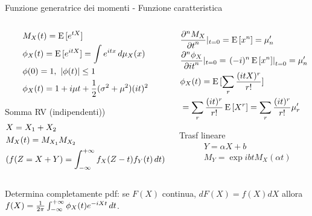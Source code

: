 \begin{frame}{Funzione generatrice dei momenti - Funzione caratteristica}
\begin{columns}[T]
\begin{column}{0.5\textwidth}
\begin{align*}
&M_X(t)=\E{[\exp{tX}]}\\
&\phi_X(t)=\E{[\exp{itX}]}=\int\exp{itx}\,d\mu_X(x)\\
&\phi(0)=1,\ |\phi(t)|\leq1\\
&\phi_X(t)=1+i\mu t+\frac{1}{2}(\sigma^2+\mu^2)(it)^2
\end{align*}
\begin{block}{Somma RV (indipendenti))}
\begin{align*}
&X=X_1+X_2\\
&M_X(t)=M_{X_1}M_{X_2}\\
&(f(Z=X+Y)=\intsinf{}f_X(Z-t)f_Y(t)\,dt)
\end{align*}
\end{block}
\end{column}
\begin{column}{0.5\textwidth}
\begin{align*}
&\PDyn{t}{M_X}{n}|_{t=0}=\E{[x^n]}=\mu_n'\\
&\PDyn{it}{\phi_X}{n}|_{t=0}=\left.(-i)^n\E{[x^n]}\right|_{t=0}=\mu_n'\\
&\phi_X(t)=\E{[\sum_r\frac{(itX)^r}{r!}]}\\
&=\sum_r\frac{(it)^r}{r!}\E{[X^r]}=\sum_r\frac{(it)^r}{r!}\mu_r'
\end{align*}
\begin{block}{Trasf lineare}
\begin{align*}
&Y=\alpha X+b\\
&M_Y=\exp{ibt}M_X(\alpha t)
\end{align*}
\end{block}
\end{column}
\end{columns}
Determina completamente pdf: se $F(X)$ continua, $dF(X)=f(X)dX$ allora $f(X)=\frac{1}{2\pi}\intsinf{}\phi_X(t)\exp{-iXt}\,dt$.
\end{frame}

